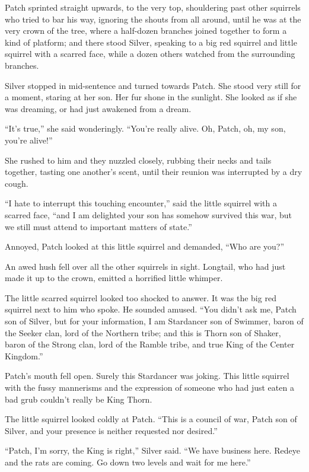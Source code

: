 \documentclass[ebook,oneside,openany,17pt]{memoir}
\newenvironment{tolerant}[1]{%
  \par\tolerance=#1\relax
}{%
  \par
}
\begin{document}
Patch sprinted straight upwards, to the very top, shouldering past
other squirrels who tried to bar his way, ignoring the shouts from all
around, until he was at the very crown of the tree, where a half-dozen
branches joined together to form a kind of platform; and there stood
Silver, speaking to a big red squirrel and little squirrel with a
scarred face, while a dozen others watched from the surrounding
branches.

Silver stopped in mid-sentence and turned towards Patch. She stood
very still for a moment, staring at her son. Her fur shone in the
sunlight. She looked as if she was dreaming, or had just awakened from
a dream.

“It’s true,” she said wonderingly. “You’re really alive. Oh, Patch,
oh, my son, you’re alive!”

She rushed to him and they nuzzled closely, rubbing their necks and
tails together, tasting one another’s scent, until their reunion was
interrupted by a dry cough.

“I hate to interrupt this touching encounter,” said the little
squirrel with a scarred face, “and I am delighted your son has somehow
survived this war, but we still must attend to important matters of
state.”

Annoyed, Patch looked at this little squirrel and demanded, “Who are
you?”

An awed hush fell over all the other squirrels in sight. Longtail, who
had just made it up to the crown, emitted a horrified little whimper.

\begin{tolerant}{2000}
The little scarred squirrel looked too shocked to answer. It was the
big red squirrel next to him who spoke. He sounded amused. “You didn’t
ask me, Patch son of Silver, but for your information, I am Stardancer
son of Swimmer, baron of the Seeker clan, lord of the Northern tribe;
and this is Thorn son of Shaker, baron of the Strong clan, lord of the
Ramble tribe, and true King of the Center Kingdom.”
\end{tolerant}

Patch’s mouth fell open. Surely this Stardancer was joking. This
little squirrel with the fussy mannerisms and the expression of
someone who had just eaten a bad grub couldn’t really be King Thorn.

The little squirrel looked coldly at Patch. “This is a council of war,
Patch son of Silver, and your presence is neither requested nor
desired.”

“Patch, I’m sorry, the King is right,” Silver said. “We have business
here. Redeye and the rats are coming. Go down two levels and wait for
me here.”
\end{document}
